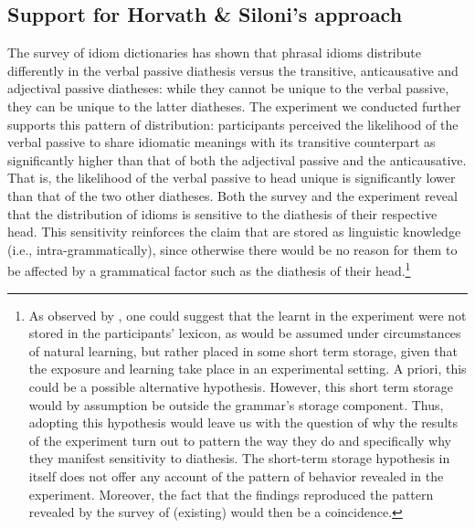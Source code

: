 \documentclass[output=paper]{langsci/langscibook}
\begin{document}
\subsection{Support for Horvath \& Siloni’s approach}  %

\largerpage
The survey of  idiom dictionaries has shown that phrasal idioms
distribute differently in the verbal passive diathesis versus the transitive,
anticausative and adjectival passive diatheses: while they cannot be unique to
the verbal passive, they can be unique to the latter diatheses. The experiment
we conducted further supports this pattern of distribution: participants
perceived the likelihood of the verbal passive to share idiomatic meanings with
its transitive counterpart as significantly higher than that of both the
adjectival passive and the anticausative. That is, the likelihood of the verbal
passive to head unique  is significantly lower than that of the two other
diatheses. Both the survey and the experiment reveal that the distribution of
idioms is sensitive to the diathesis of their respective head.  This
sensitivity reinforces the claim that  are stored as linguistic knowledge
(i.e., intra-grammatically), since otherwise there would be no reason for them
to be affected by a grammatical factor such as the diathesis of their
head.\footnote{As observed by \textcite{SilHorKluWex2018}, one could suggest that
    the learnt  in the experiment were not stored in the participants'
    lexicon, as would be assumed under circumstances of natural learning, but
    rather placed in some short term storage, given that the exposure and
    learning take place in an experimental setting. A priori, this could be a
    possible alternative hypothesis.  However, this short term storage would by
    assumption be outside the grammar’s storage component. Thus, adopting this
    hypothesis would leave us with the question of why the results of the
    experiment turn out to pattern the way they do and specifically why they
    manifest sensitivity to diathesis. The short-term storage hypothesis in
    itself does not offer any account of the pattern of behavior revealed in
    the experiment. Moreover, the fact that the findings reproduced the pattern
    revealed by the survey of (existing)  would then be a coincidence. }
\end{document}
